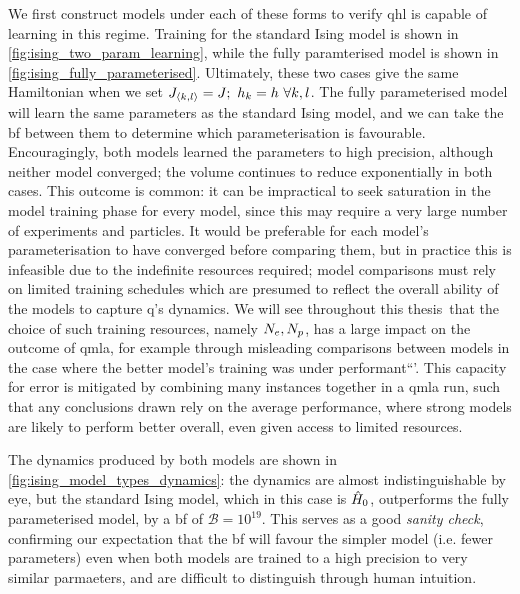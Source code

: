 We first construct models under each of these forms to verify \gls{qhl} is capable of learning in this regime. 
Training for the standard Ising model is shown in \cref{fig:ising_two_param_learning}, 
    while the fully paramterised model is shown in \cref{fig:ising_fully_parameterised}. 
Ultimately, these two cases give the same Hamiltonian when we set $J_{{ \langle k, l \rangle }} = J; \ h_k = h \ \forall k,l$.
The fully parameterised model will learn the same parameters as the standard Ising model,
    and we can take the \gls{bf} between them to determine which parameterisation is favourable.
Encouragingly, both models learned the parameters to high precision, although neither model converged; 
    the \gls{volume} continues to reduce exponentially in both cases.
This outcome is common: it can be impractical to seek saturation in the model training phase for every model, 
    since this may require a very large number of experiments and particles. 
It would be preferable for each model's parameterisation to have converged before comparing them, 
    but in practice this is infeasible due to the indefinite resources required; 
    model comparisons must rely on limited training schedules which are presumed to reflect the overall ability of 
    the models to capture \gls{q}'s dynamics. 
We will see throughout this thesis\footnotemark \ that the choice of such training resources, namely $N_e, N_p$, 
    has a large impact on the outcome of \gls{qmla}, for example through misleading comparisons between models 
    in the case where the better model's training was under performant``'. 
This capacity for error is mitigated by combining many \glspl{instance} together in 
    a \gls{qmla} \gls{run}, such that any conclusions drawn rely on the average performance, 
    where strong models are likely to perform better overall, even given access to limited resources. 
\par 

The dynamics produced by both models are shown in \cref{fig:ising_model_types_dynamics}:
    the dynamics are almost indistinguishable by eye, but the standard Ising model, 
    which in this case is $\hat{H}_0$, outperforms the fully parameterised model, 
    by a \gls{bf} of $\mathcal{B} = 10^{19}$.
This serves as a good \emph{sanity check}, confirming our expectation that 
    the \gls{bf} will favour the simpler model (i.e. fewer parameters) even when both models 
    are trained to a high precision to very similar parmaeters, and are difficult to distinguish through human intuition. 


